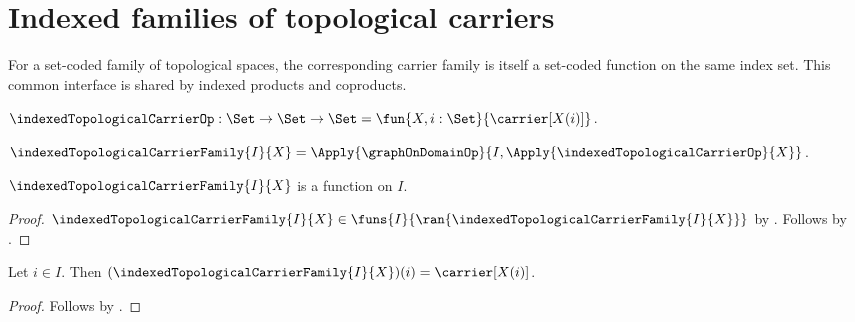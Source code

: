 \section{Indexed families of topological carriers}




For a set-coded family of topological spaces, the corresponding carrier
family is itself a set-coded function on the same index set.  This common
interface is shared by indexed products and coproducts.

\begin{definition}\label{indexed_topological_carrier_op}
    $\indexedTopologicalCarrierOp:\Set\to\Set\to\Set
        =\fun{X,i:\Set}{\carrier[X(i)]}$.
\end{definition}

\begin{definition}\label{indexed_topological_carrier_family}
    $\indexedTopologicalCarrierFamily{I}{X}
        =\Apply{\graphOnDomainOp}{
            I,\Apply{\indexedTopologicalCarrierOp}{X}}$.
\end{definition}

\begin{proposition}\label{indexed_topological_carrier_family_type}
    $\indexedTopologicalCarrierFamily{I}{X}$ is a function on $I$.
\end{proposition}
\begin{proof}
    $\indexedTopologicalCarrierFamily{I}{X}\in
        \funs{I}{\ran{\indexedTopologicalCarrierFamily{I}{X}}}$ by
        .
    Follows by .
\end{proof}

\begin{proposition}\label{indexed_topological_carrier_family_apply}
    Let $i\in I$.
    Then $(\indexedTopologicalCarrierFamily{I}{X})(i)
        =\carrier[X(i)]$.
\end{proposition}
\begin{proof}
    Follows by
        .
\end{proof}
